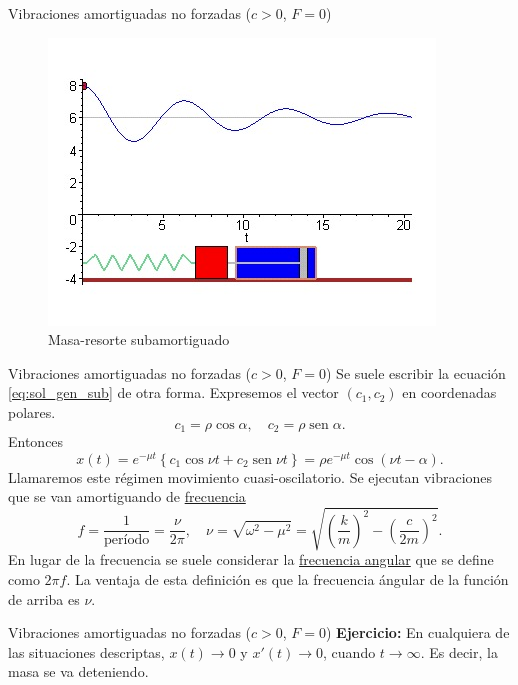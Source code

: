 \documentclass[handout,hyperref={colorlinks=true}]{beamer}
\renewcommand{\emph}[1]{\textcolor[rgb]{1,0,0}{#1}}
\DeclareMathOperator{\sen}{sen}
\begin{document}
\begin{frame}{ Vibraciones amortiguadas no forzadas ($c>0$, $F=0$) }
\begin{figure}[h]
\includegraphics[scale=.4]{res_sub/res_sub-0.jpg}
\vspace{.5cm}
\caption{Masa-resorte subamortiguado}
\end{figure}
 
\end{frame}


\begin{frame}{ Vibraciones amortiguadas no forzadas ($c>0$, $F=0$) }
Se suele escribir la ecuación \eqref{eq:sol_gen_sub} de otra forma. Expresemos el vector $(c_1,c_2)$ en 
coordenadas polares. 
\[
c_1=\rho\cos\alpha,\quad c_2=\rho\sen\alpha.
\]
Entonces
\[
 x(t)=e^{-\mu t}\left\{ c_1\cos \nu t+c_2\sen \nu t    \right\}=\boxed{\rho e^{-\mu t}\cos(\nu t-\alpha)}.
\]
Llamaremos este régimen \emph{movimiento  cuasi-oscilatorio}. Se ejecutan vibraciones que se van amortiguando
de \href{http://es.wikipedia.org/wiki/Frecuencia}{frecuencia}
\[
  f=\frac{1}{\text{período}}=\frac{\nu}{2\pi},\quad \nu=\sqrt{\omega^2-\mu^2}=\sqrt{\left(\frac{k}{m}\right)^2-
  \left(\frac{c}{2m}\right)^2}.
\]
En lugar de la frecuencia se suele considerar la 
\href{http://luz.izt.uam.mx/mediawiki/index.php/Frecuencia_angular}{frecuencia angular} que se define como 
$2\pi f$. La ventaja de esta definición es que la frecuencia ángular de la función de arriba es
$\nu$. 
\end{frame}



\begin{frame}{ Vibraciones amortiguadas no forzadas ($c>0$, $F=0$) }
\textbf{Ejercicio:} En cualquiera de las situaciones descriptas, $x(t)\to 0$ y $x'(t)\to 0$, cuando $t\to\infty$. 
Es decir, la masa se va deteniendo.                                                                                                                                                                                                                                                                         
 


\end{frame}
\end{document}
